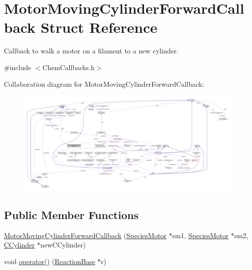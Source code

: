 \hypertarget{structMotorMovingCylinderForwardCallback}{\section{Motor\+Moving\+Cylinder\+Forward\+Callback Struct Reference}
\label{structMotorMovingCylinderForwardCallback}
}


Callback to walk a motor on a filament to a new cylinder.  




{\ttfamily \#include $<$Chem\+Callbacks.\+h$>$}



Collaboration diagram for Motor\+Moving\+Cylinder\+Forward\+Callback\+:\nopagebreak
\begin{figure}[H]
\begin{center}
\leavevmode
\includegraphics[width=350pt]{structMotorMovingCylinderForwardCallback__coll__graph}
\end{center}
\end{figure}
\subsection*{Public Member Functions}
\begin{DoxyCompactItemize}
\item 
\hyperlink{structMotorMovingCylinderForwardCallback_a53e91b08cc575dd3d9ee154f2b6e07fb}{Motor\+Moving\+Cylinder\+Forward\+Callback} (\hyperlink{classSpeciesMotor}{Species\+Motor} $\ast$sm1, \hyperlink{classSpeciesMotor}{Species\+Motor} $\ast$sm2, \hyperlink{classCCylinder}{C\+Cylinder} $\ast$new\+C\+Cylinder)
\item 
void \hyperlink{structMotorMovingCylinderForwardCallback_a2b4b90a88f016b07e2d42589b456aab4}{operator()} (\hyperlink{classReactionBase}{Reaction\+Base} $\ast$r)
\end{DoxyCompactItemize}
